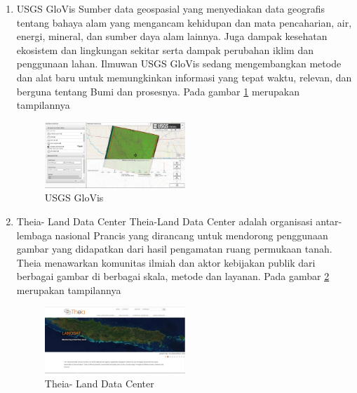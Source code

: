 \begin{enumerate}
\item USGS GloVis
Sumber data geospasial yang menyediakan data geografis tentang bahaya alam yang mengancam kehidupan dan mata pencaharian, air, energi, mineral, dan sumber daya alam lainnya. Juga dampak kesehatan ekosistem dan lingkungan sekitar serta dampak perubahan iklim dan penggunaan lahan. Ilmuwan USGS GloVis sedang mengembangkan metode dan alat baru untuk memungkinkan informasi yang tepat waktu, relevan, dan berguna tentang Bumi dan prosesnya.  Pada gambar \ref{labelgambar6} merupakan tampilannya  

\begin{figure}[ht]
\centering
\includegraphics[width=0.5\textwidth]{pictures/USGS_GloVis}
\caption{USGS GloVis}
\label{labelgambar6}
\end{figure}

\item Theia- Land Data Center
Theia-Land Data Center adalah organisasi antar-lembaga nasional Prancis yang dirancang untuk mendorong penggunaan gambar yang didapatkan dari hasil pengamatan ruang permukaan tanah. Theia menawarkan komunitas ilmiah dan aktor kebijakan publik dari berbagai gambar di berbagai skala, metode dan layanan.  Pada gambar \ref{labelgambar7} merupakan tampilannya  
\begin{figure}[ht]
\centering
\includegraphics[width=0.5\textwidth]{pictures/Theia_Land_Data_Center}
\caption{Theia- Land Data Center}
\label{labelgambar7}
\end{figure}
\end{enumerate}